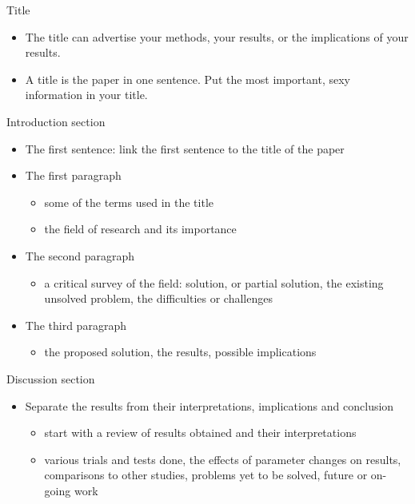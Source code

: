 \documentclass[
 size=14pt,
 paper=smartboard,  %
 mode=present, 		%
 display=slides, 	%
 style=tuliplab,  	%
 pauseslide,
 fleqn,leqno]{powerdot}{}
\begin{document}

\begin{slide}[toc=,bm=]{Title}
	\begin{itemize}
		\item The title can advertise your methods, your results, or the implications of your results.
		\item A title is the paper in one sentence. Put the most important, sexy information in your title. 
	\end{itemize}	
\end{slide}


\begin{slide}[toc=,bm=]{Introduction section}
	\begin{itemize}
		\item The first sentence: link the first sentence to the title of the paper
		\item The first paragraph
			\begin{itemize}
				\item some of the terms used in the title
				\item the field of research and its importance
			\end{itemize}
		\item The second paragraph
			\begin{itemize}
				\item a critical survey of the field: solution, or partial solution, the existing unsolved problem, the difficulties or challenges
			\end{itemize}
		\item The third paragraph
			\begin{itemize}
				\item the proposed solution, the results, possible implications
			\end{itemize}
	\end{itemize}	
\end{slide}


\begin{slide}[toc=,bm=]{Discussion section}
	\begin{itemize}
		\item Separate the results from their interpretations, implications and conclusion
			\begin{itemize}
				\item start with a review of results obtained and their interpretations 
				\item various trials and tests done, the effects of parameter changes on results, comparisons to other studies, problems yet to be solved, future or on-going work
			\end{itemize}
	\end{itemize}	
\end{slide}
\end{document}
